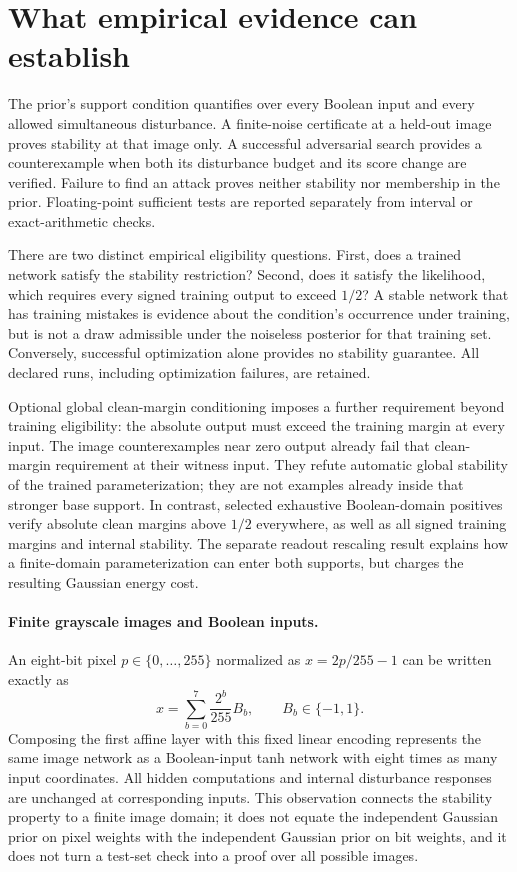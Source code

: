 \section{What empirical evidence can establish}
\label{sec:empirical-interpretation}

The prior's support condition quantifies over every Boolean input and every
allowed simultaneous disturbance. A finite-noise certificate at a held-out
image proves stability at that image only. A successful adversarial search
provides a counterexample when both its disturbance budget and its score
change are verified. Failure to find an attack proves neither stability
nor membership in the prior. Floating-point sufficient tests are reported
separately from interval or exact-arithmetic checks.

There are two distinct empirical eligibility questions. First, does a
trained network satisfy the stability restriction? Second, does it satisfy
the likelihood, which requires every signed training output to exceed
$1/2$? A stable network that has training mistakes is evidence about the
condition's occurrence under training, but is not a draw admissible under
the noiseless posterior for that training set. Conversely, successful
optimization alone provides no stability guarantee. All declared runs,
including optimization failures, are retained.

Optional global clean-margin conditioning imposes a further requirement
beyond training eligibility: the absolute output must exceed the training
margin at every input. The image counterexamples near
zero output already fail that clean-margin requirement at their witness
input. They refute automatic global stability of the trained
parameterization; they are not examples already inside that stronger
base support. In contrast, selected exhaustive Boolean-domain positives
verify absolute clean margins above $1/2$ everywhere, as well as all
signed training margins and internal stability. The separate readout
rescaling result explains how a finite-domain parameterization can enter
both supports, but charges the resulting Gaussian energy cost.

\paragraph{Finite grayscale images and Boolean inputs.}
An eight-bit pixel $p\in\{0,\ldots,255\}$ normalized as $x=2p/255-1$
can be written exactly as
\[
 x=\sum_{b=0}^{7}\frac{2^b}{255}B_b,\qquad B_b\in\{-1,1\}.
\]
Composing the first affine layer with this fixed linear encoding represents
the same image network as a Boolean-input tanh network with eight times
as many input coordinates. All hidden computations and internal disturbance
responses are unchanged at corresponding inputs. This observation connects
the stability property to a finite image domain; it does not equate the
independent Gaussian prior on pixel weights with the independent Gaussian
prior on bit weights, and it does not turn a test-set check into a proof
over all possible images.

